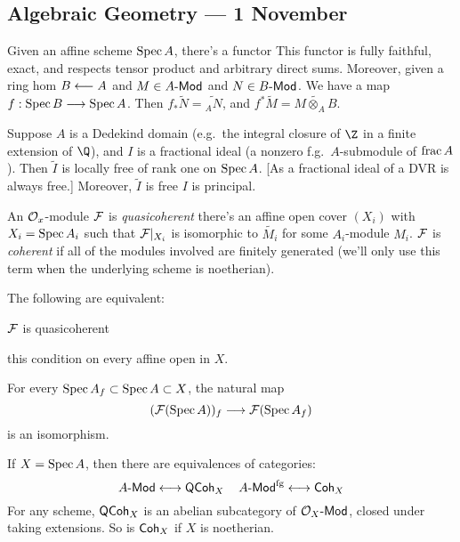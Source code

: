 \documentclass[11pt]{article}
\begin{document}
\begin{Nov1}
\section*{Algebraic Geometry --- 1 November}
Given an affine scheme $\operatorname{Spec} A$, there's a functor
This functor is fully faithful, exact, and respects tensor product and arbitrary direct sums. Moreover, given a ring hom $B\longleftarrow A$ and $M\in A\operatorname{{\mathsf{\!-Mod}}}$ and $N\in B\operatorname{{\mathsf{\!-Mod}}}$. We have a map $f:\operatorname{Spec} B\longrightarrow\operatorname{Spec} A$. Then $f_*\widetilde N=\widetilde{_AN}$, and $f^*\widetilde M=\widetilde{M\otimes_AB}$.
\begin{exmp*}
Suppose $A$ is a Dedekind domain (e.g.\ the integral closure of $\Z$ in a finite extension of $\Q$), and $I$ is a fractional ideal (a nonzero f.g.\ $A$-submodule of $\operatorname{frac} A$). Then $\widetilde I$ is locally free of rank one on $\operatorname{Spec} A$. [As a fractional ideal of a DVR is always free.]  Moreover, $\widetilde I$ is free \Iff $I$ is principal.
\end{exmp*}
\begin{defn*}
An $\mathcal{O}_x$-module $\mathcal{F}$ is \emph{quasicoherent} \Iff there's an affine open cover $(X_i)$ with $X_i=\operatorname{Spec} A_i$ such that $\mathcal{F}|_{X_i}$ is isomorphic to $\widetilde {M_i}$ for some $A_i$-module $M_i$. $\mathcal{F}$ is \emph{coherent} if all of the modules involved are finitely generated (we'll only use this term when the underlying scheme is noetherian).
\end{defn*}
\begin{prop*}
The following are equivalent:
\begin{itemise}
\item $\mathcal{F}$ is quasicoherent
\item this condition on every affine open in $X$.
\item For every $\operatorname{Spec} A_f\subset\operatorname{Spec} A\subset X$, the natural map
\[(\mathcal{F}(\operatorname{Spec} A))_f\longrightarrow\mathcal{F}(\operatorname{Spec} A_f)\]
is an isomorphism.
\end{itemise}
\end{prop*}
\begin{exmp*}
If $X=\operatorname{Spec} A$, then there are equivalences of categories:
\[A\Modules\longleftrightarrow\QuasiCoherent_X\ \ \ A\fgModules\longleftrightarrow\Coherent_X\]
For any scheme, $\operatorname{{\mathsf{QCoh}}}_X$ is an abelian subcategory of $\mathcal{O}_X\operatorname{{\mathsf{\!-Mod}}}$, closed under taking extensions. So is $\operatorname{{\mathsf{Coh}}}_X$ if $X$ is noetherian.
\end{exmp*}

\end{Nov1}
\end{document}
